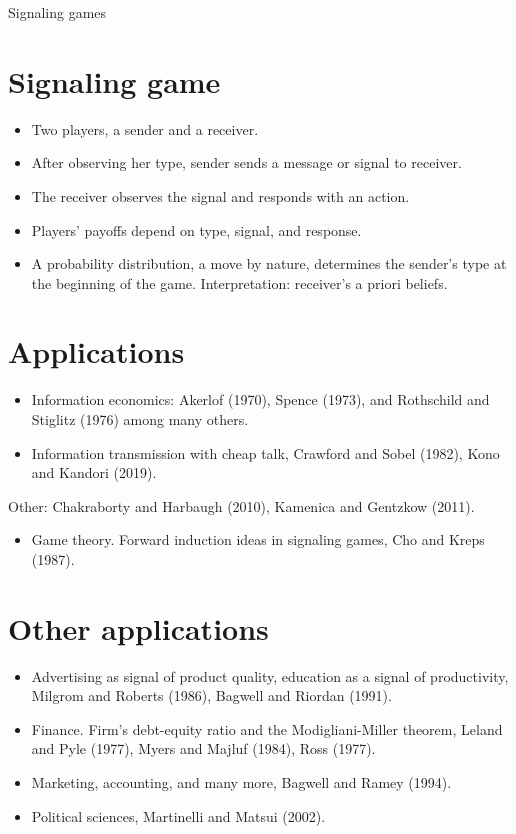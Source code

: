\documentclass[10pt]{article}
\begin{document}
\captionsetup{singlelinecheck=false}
Signaling games

\section*{Signaling game}
\begin{itemize}
  \item Two players, a sender and a receiver.
  \item After observing her type, sender sends a message or signal to receiver.
  \item The receiver observes the signal and responds with an action.
  \item Players' payoffs depend on type, signal, and response.
  \item A probability distribution, a move by nature, determines the sender's type at the beginning of the game. Interpretation: receiver's a priori beliefs.
\end{itemize}

\section*{Applications}
\begin{itemize}
  \item Information economics: Akerlof (1970), Spence (1973), and Rothschild and Stiglitz (1976) among many others.
  \item Information transmission with cheap talk, Crawford and Sobel (1982), Kono and Kandori (2019).
\end{itemize}

Other: Chakraborty and Harbaugh (2010), Kamenica and Gentzkow (2011).

\begin{itemize}
  \item Game theory. Forward induction ideas in signaling games, Cho and Kreps (1987).
\end{itemize}

\section*{Other applications}
\begin{itemize}
  \item Advertising as signal of product quality, education as a signal of productivity, Milgrom and Roberts (1986), Bagwell and Riordan (1991).
  \item Finance. Firm's debt-equity ratio and the Modigliani-Miller theorem, Leland and Pyle (1977), Myers and Majluf (1984), Ross (1977).
  \item Marketing, accounting, and many more, Bagwell and Ramey (1994).
  \item Political sciences, Martinelli and Matsui (2002).
\end{itemize}
\end{document}
